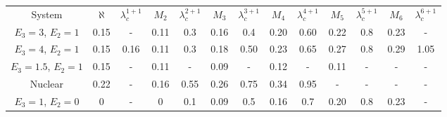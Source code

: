 \documentclass[aps,nofootinbib,prl,showpacs,twocolumn,groupedaddress,superscriptaddress]
{revtex4}
\begin{document}
\begin{center}
\begin{tabular}{ |c|c c | c c | c c | c c | c c | c c | } 
 \hline
System           & $\aleph$ & $\lambda_c^{1+1}$ & $M_2$ & $\lambda_c^{2+1}$ & $M_3$ & $\lambda_c^{3+1}$ & $M_4$ & $\lambda_c^{4+1}$ & $M_5$ & $\lambda_c^{5+1}$ & $M_6$& $\lambda_c^{6+1}$  \\ 
$E_3=3$, $E_2=1$  & 0.15 &    - & 0.11 & 0.3    & 0.16 & 0.4 & 0.20 & 0.60 & 0.22 & 0.8 & 0.23 & -\\
$E_3=4$, $E_2=1$  & 0.15 & 0.16 & 0.11 & 0.3    & 0.18& 0.50 & 0.23 & 0.65 & 0.27 & 0.8 & 0.29&1.05\\ 
$E_3=1.5$, $E_2=1$& 0.15&-&0.11&-&0.09&-&0.12&-&0.11&-&-&-\\
Nuclear           & 0.22&-&0.16&0.55&0.26&0.75&0.34&0.95&-&-&-&-\\
$E_3=1$, $E_2=0$  & 0&-&0&0.1&0.09&0.5&0.16&0.7&0.20&0.8&0.23&-\\
 \hline
\end{tabular}
\end{center}



\end{document}

